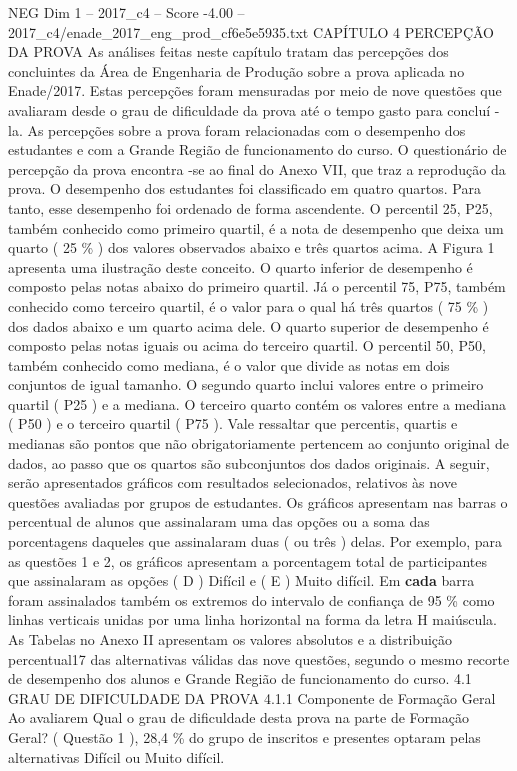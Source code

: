 \begin{textsample}{NEG Dim 1 – 2017\_c4 – Score -4.00 – 2017\_c4/enade\_2017\_eng\_prod\_cf6e5e5935.txt}  \label{ex:f1_neg_163}
CAPÍTULO 4 PERCEPÇÃO DA PROVA As análises feitas neste capítulo tratam das percepções dos concluintes da Área de Engenharia de Produção sobre a prova aplicada no Enade/2017.
Estas percepções foram mensuradas por meio de nove questões que avaliaram desde o grau de dificuldade da prova até o tempo gasto para concluí -la.
As percepções sobre a prova foram relacionadas com o desempenho dos estudantes e com a Grande Região de funcionamento do curso.
O questionário de percepção da prova encontra -se ao final do Anexo VII, que traz a reprodução da prova.
O desempenho dos estudantes foi classificado em quatro quartos.
Para tanto, esse desempenho foi ordenado de forma ascendente.
O percentil 25, P25, também conhecido como primeiro quartil, é a nota de desempenho que deixa um quarto ( 25 \% ) dos valores observados abaixo e três quartos acima.
A Figura 1 apresenta uma ilustração deste conceito.
O quarto inferior de desempenho é composto pelas notas abaixo do primeiro quartil.
Já o percentil 75, P75, também conhecido como terceiro quartil, é o valor para o qual há três quartos ( 75 \% ) dos dados abaixo e um quarto acima dele.
O quarto superior de desempenho é composto pelas notas iguais ou acima do terceiro quartil.
O percentil 50, P50, também conhecido como mediana, é o valor que divide as notas em dois conjuntos de igual tamanho.
O segundo quarto inclui valores entre o primeiro quartil ( P25 ) e a mediana.
O terceiro quarto contém os valores entre a mediana ( P50 ) e o terceiro quartil ( P75 ).
Vale ressaltar que percentis, quartis e medianas são pontos que não obrigatoriamente pertencem ao conjunto original de dados, ao passo que os quartos são subconjuntos dos dados originais.
A seguir, serão apresentados gráficos com resultados selecionados, relativos às nove questões avaliadas por grupos de estudantes.
Os gráficos apresentam nas barras o percentual de alunos que assinalaram uma das opções ou a soma das porcentagens daqueles que assinalaram duas ( ou três ) delas.
Por exemplo, para as questões 1 e 2, os gráficos apresentam a porcentagem total de participantes que assinalaram as opções ( D ) Difícil e ( E ) Muito difícil.
Em \textbf{cada} barra foram assinalados também os extremos do intervalo de confiança de 95 \% como linhas verticais unidas por uma linha horizontal na forma da letra H maiúscula.
As Tabelas no Anexo II apresentam os valores absolutos e a distribuição percentual17 das alternativas válidas das nove questões, segundo o mesmo recorte de desempenho dos alunos e Grande Região de funcionamento do curso. 4.1 GRAU DE DIFICULDADE DA PROVA 4.1.1 Componente de Formação Geral Ao avaliarem Qual o grau de dificuldade desta prova na parte de Formação Geral? ( Questão 1 ), 28,4 \% do grupo de inscritos e presentes optaram pelas alternativas Difícil ou Muito difícil.

\end{textsample}
